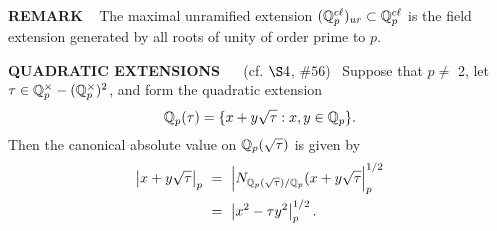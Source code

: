 \begin{x}{\small\bf REMARK} \ %
The maximal unramified extension 
$(\mathbb{Q}_p^{c\ell})_{ur} \subset \mathbb{Q}_p^{c\ell}$ 
is the field extension generated by all roots of unity of order prime to $p$.
\end{x}

\vspace{0.1cm}

\begin{x}{\small\bf QUADRATIC EXTENSIONS} \ \ %
(cf. $\S 4$, $\#56$)  \ Suppose that $p \ne$ 2, 
let $\tau \in \mathbb{Q}_p^\times - (\mathbb{Q}_p^\times)^2$, and form the quadratic extension
\[
\mathbb{Q}_p(\tau) = \{x + y\sqrt{\tau} : x, y \in \mathbb{Q}_p\}.
\]
Then the canonical absolute value on $\mathbb{Q}_p(\sqrt{\tau})$ is given by
\[
\begin{aligned}
\abs{x + y\sqrt{\tau}}_p \ 
&= \ \abs{N_{\Q_p(\sqrt{\tau})/\Q_p}   (x + y\sqrt{\tau}}_p^{1/2} \\
&= \ \abs{x^2 - \tau y^2}_p^{1/2}.
\end{aligned}
\]
\end{x}

\vspace{0.1cm}

